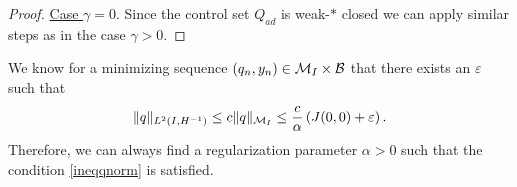 \begin{proof}
\underline{Case $\gamma = 0$}. Since the control set $Q_{ad}$ is weak-$*$ closed we can apply similar steps as in the case $\gamma >0$.
\end{proof}
\begin{rmk}
 We know for a minimizing sequence $(q_n, y_n)\in \mathcal{M}_I\times \mathcal B$ that there exists an $\varepsilon$ such that
 \[
\lVert q\rVert_{L^2(I,H^{-1})} \leq c\lVert q\rVert_{\mathcal{M}_I} \leq \frac{c}{\alpha}\left(J(0,0) + \varepsilon \right).
 \]
 Therefore, we can always find a regularization parameter $\alpha>0$ such that the condition \eqref{ineqqnorm} is satisfied.
\end{rmk}

